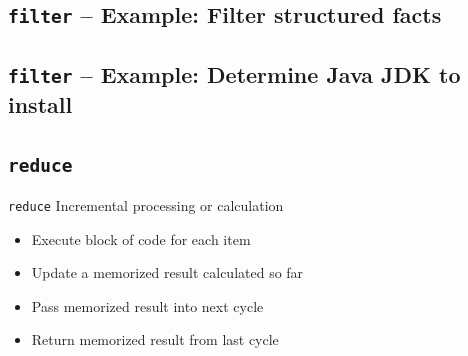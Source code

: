 \documentclass[english,aspectratio=43,nohandout]{beamer}
\begin{document}
\subsection{\texttt{filter} -- Example: Filter structured facts}
\begin{frame}{\insertsection}{\insertsubsection}

\end{frame}

\begin{frame}{\insertsection}{\insertsubsection}

\end{frame}

\subsection{\texttt{filter} -- Example: Determine Java JDK to install}
\begin{frame}{\insertsection}{\insertsubsection}

\end{frame}

\begin{frame}{\insertsection}{\insertsubsection}

\end{frame}

\subsection{\texttt{reduce}}

\begin{frame}{\insertsection}{\insertsubsection}

\begin{block}{\texttt{reduce}}
Incremental processing or calculation
\end{block}

\vspace{\baselineskip}\pause

\begin{itemize}
\item Execute block of code for each item
\item Update a memorized result calculated so far
\item Pass memorized result into next cycle
\item Return memorized result from last cycle
\end{itemize}
\end{frame}
\end{document}
